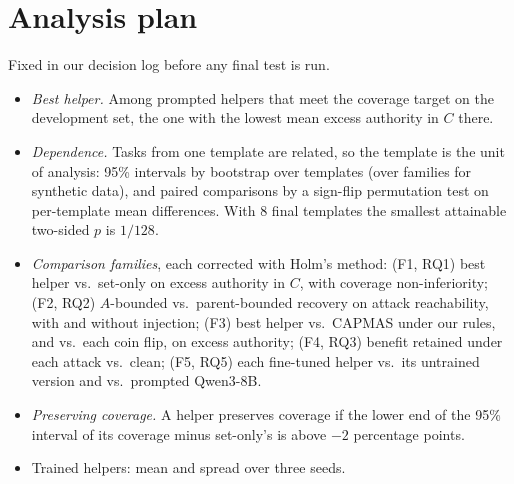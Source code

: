 \documentclass[10pt]{article}
\begin{document}
\section{Analysis plan}\label{sec:stats}
Fixed in our decision log before any final test is run.
\begin{itemize}
  \item \emph{Best helper.} Among prompted helpers that meet the coverage target on the development set, the one with the
    lowest mean excess authority in $C$ there.
  \item \emph{Dependence.} Tasks from one template are related, so the template is the unit of analysis: 95\% intervals by
    bootstrap over templates (over families for synthetic data), and paired comparisons by a sign-flip permutation test on
    per-template mean differences. With 8 final templates the smallest attainable two-sided $p$ is $1/128$.
  \item \emph{Comparison families}, each corrected with Holm's method:
    (F1, RQ1) best helper vs.\ set-only on excess authority in $C$, with coverage non-inferiority;
    (F2, RQ2) $A$-bounded vs.\ parent-bounded recovery on attack reachability, with and without injection;
    (F3) best helper vs.\ CAPMAS under our rules, and vs.\ each coin flip, on excess authority;
    (F4, RQ3) benefit retained under each attack vs.\ clean;
    (F5, RQ5) each fine-tuned helper vs.\ its untrained version and vs.\ prompted Qwen3-8B.
  \item \emph{Preserving coverage.} A helper preserves coverage if the lower end of the 95\% interval of its coverage minus
    set-only's is above $-2$ percentage points.
  \item Trained helpers: mean and spread over three seeds.
\end{itemize}
\end{document}
